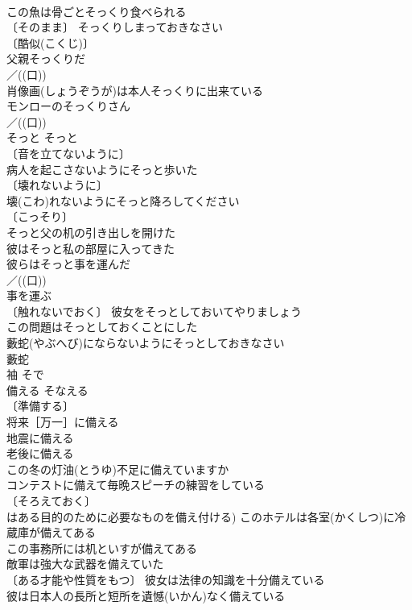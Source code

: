 \documentclass[8pt]{extreport}
\begin{document}
\begin{CJK}{UTF8}{min}
\\	この魚は骨ごとそっくり食べられる 
\\	〔そのまま〕 そっくりしまっておきなさい 
\\	〔酷似(こくじ)〕
\\	父親そっくりだ 
\\	／((口)) 
\\	肖像画(しょうぞうが)は本人そっくりに出来ている 
\\	モンローのそっくりさん 
\\	／((口))
\\	そっと	そっと	
\\	〔音を立てないように〕
\\	病人を起こさないようにそっと歩いた 
\\	〔壊れないように〕
\\	壊(こわ)れないようにそっと降ろしてください 
\\	〔こっそり〕
\\	そっと父の机の引き出しを開けた 
\\	彼はそっと私の部屋に入ってきた 
\\	彼らはそっと事を運んだ 
\\	／((口))
\\	事を運ぶ　
\\	〔触れないでおく〕 彼女をそっとしておいてやりましょう 
\\	この問題はそっとしておくことにした 
\\	藪蛇(やぶへび)にならないようにそっとしておきなさい 
\\	藪蛇　　
\\	袖	そで	
\\	備える	そなえる	
\\	〔準備する〕
\\	将来［万一］に備える 
\\	地震に備える 
\\	老後に備える 
\\	この冬の灯油(とうゆ)不足に備えていますか 
\\	コンテストに備えて毎晩スピーチの練習をしている 
\\	〔そろえておく〕
\\	はある目的のために必要なものを備え付ける) このホテルは各室(かくしつ)に冷蔵庫が備えてある 
\\	この事務所には机といすが備えてある 
\\	敵軍は強大な武器を備えていた 
\\	〔ある才能や性質をもつ〕 彼女は法律の知識を十分備えている 
\\	彼は日本人の長所と短所を遺憾(いかん)なく備えている 

\end{CJK}
\end{document}
